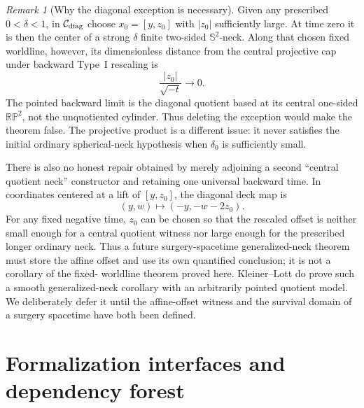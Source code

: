 \documentclass[10pt]{coll-l}
\newcommand{\Sph}{\mathbb{S}}
\theoremstyle{definition}
\theoremstyle{remark}
\newtheorem{remark}[theorem]{Remark}
\numberwithin{section}{chapter}
\numberwithin{equation}{chapter}
\begin{document}
\begin{remark}[Why the diagonal exception is necessary]
\label{rem:ncs-diagonal-stability-counterexample}
Given any prescribed $0<\delta<1$, in $\mathcal C_{\rm diag}$ choose
$x_0=[y,z_0]$ with $|z_0|$ sufficiently large.  At time zero it is then the
center of a strong $\delta$ finite two-sided $\Sph^2$-neck.  Along that
chosen fixed worldline, however, its dimensionless
distance from the central projective cap under backward Type~I rescaling is
\begin{equation}
                       \frac{|z_0|}{\sqrt{-t}}\longrightarrow0.          \label{eq:ncs-diagonal-worldline-to-soul}
\end{equation}
The pointed backward limit is the diagonal quotient based at its central
one-sided $\mathbb{RP}^2$, not the unquotiented cylinder.  Thus deleting the
exception would make the theorem false.  The projective product is a
different issue: it never satisfies the initial ordinary spherical-neck
hypothesis when $\delta_0$ is sufficiently small.

There is also no honest repair obtained by merely adjoining a second
``central quotient neck'' constructor and retaining one universal backward
time.  In coordinates centered at a lift of $[y,z_0]$, the diagonal deck
map is
\begin{equation}
                         (y,w)\longmapsto(-y,-w-2z_0).
                         \label{eq:ncs-diagonal-affine-deck-map}
\end{equation}
For any fixed negative time, $z_0$ can be chosen so that the rescaled
offset is neither small enough for a central quotient witness nor large
enough for the prescribed longer ordinary neck.  Thus a future
surgery-spacetime generalized-neck theorem must store the affine offset
and use its own quantified conclusion; it is not a corollary of the fixed-
worldline theorem proved here.
Kleiner--Lott do prove such a smooth generalized-neck corollary with an
arbitrarily pointed quotient model.  We deliberately defer it until the
affine-offset witness and the survival domain of a surgery spacetime have
both been defined.
\end{remark}

\section{Formalization interfaces and dependency forest}
\label{sec:ncs-formalization}
\end{document}
